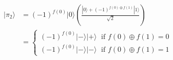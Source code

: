 \documentclass[preview]{standalone}
\begin{document}
\begin{align*}
|\pi_2\rangle &= (-1)^{f(0)}|0\rangle \left( \frac{|0\rangle + (-1)^{f(0)\oplus f(1)} |1\rangle}{\sqrt{2}}\right) \\ &=  \left\{ \begin{array}{ll} (-1)^{f(0)}|-\rangle |+\rangle \; \text{ if } f(0) \oplus f(1) = 0 \\ (-1)^{f(0)} |-\rangle |-\rangle \; \text{ if } f(0) \oplus f(1) = 1 \end{array} \right.
\end{align*}
\end{document}
